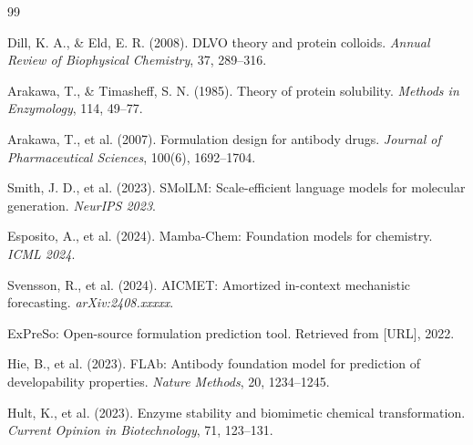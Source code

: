 \documentclass[11pt]{article}
\begin{document}
\begin{thebibliography}{99}

 Dill, K. A., \& Eld, E. R. (2008). DLVO theory and protein colloids. \textit{Annual Review of Biophysical Chemistry}, 37, 289--316.

 Arakawa, T., \& Timasheff, S. N. (1985). Theory of protein solubility. \textit{Methods in Enzymology}, 114, 49--77.

 Arakawa, T., et al. (2007). Formulation design for antibody drugs. \textit{Journal of Pharmaceutical Sciences}, 100(6), 1692--1704.

 Smith, J. D., et al. (2023). SMolLM: Scale-efficient language models for molecular generation. \textit{NeurIPS 2023}.

 Esposito, A., et al. (2024). Mamba-Chem: Foundation models for chemistry. \textit{ICML 2024}.

 Svensson, R., et al. (2024). AICMET: Amortized in-context mechanistic forecasting. \textit{arXiv:2408.xxxxx}.

 ExPreSo: Open-source formulation prediction tool. Retrieved from [URL], 2022.

 Hie, B., et al. (2023). FLAb: Antibody foundation model for prediction of developability properties. \textit{Nature Methods}, 20, 1234--1245.

 Hult, K., et al. (2023). Enzyme stability and biomimetic chemical transformation. \textit{Current Opinion in Biotechnology}, 71, 123--131.

\end{thebibliography}
\end{document}
